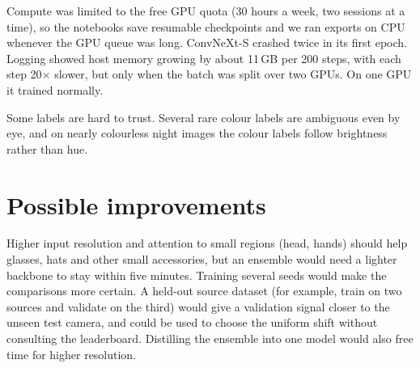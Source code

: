 \documentclass[10pt,twocolumn,letterpaper]{article}
\begin{document}
Compute was limited to the free GPU quota (30 hours a week, two sessions at a time), so the notebooks save resumable checkpoints and we ran exports on CPU whenever the GPU queue was long. ConvNeXt-S crashed twice in its first epoch. Logging showed host memory growing by about 11\,GB per 200 steps, with each step 20$\times$ slower, but only when the batch was split over two GPUs. On one GPU it trained normally.

Some labels are hard to trust. Several rare colour labels are ambiguous even by eye, and on nearly colourless night images the colour labels follow brightness rather than hue.

\section{Possible improvements}

Higher input resolution and attention to small regions (head, hands) should help glasses, hats and other small accessories, but an ensemble would need a lighter backbone to stay within five minutes. Training several seeds would make the comparisons more certain. A held-out source dataset (for example, train on two sources and validate on the third) would give a validation signal closer to the unseen test camera, and could be used to choose the uniform shift without consulting the leaderboard. Distilling the ensemble into one model would also free time for higher resolution.

{\small


}
\end{document}
